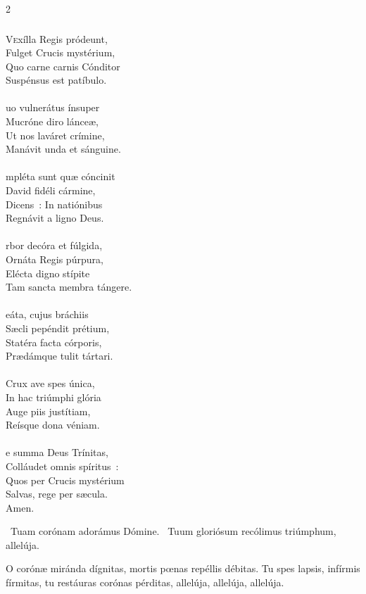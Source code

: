\documentclass[9pt,twoside]{extarticle}
\begin{document}
\begin{multicols}{2}
{{\subsubsection*{\center {}}
\lettrine{V}exílla Regis pródeunt,\\
Fulget Crucis mystérium,\\
Quo carne carnis Cónditor\\
Suspénsus est patíbulo.\\
\\
uo vulnerátus ínsuper\\
Mucróne diro lánceæ,\\
Ut nos laváret crímine,\\
Manávit unda et sánguine.\\
\\
mpléta sunt quæ cóncinit\\
David fidéli cármine,\\
Dicens~: In natiónibus\\
Regnávit a ligno Deus.\\
\\
rbor decóra et fúlgida,\\
Ornáta Regis púrpura,\\
Elécta digno stípite\\
Tam sancta membra tángere.\\
\\
eáta, cujus bráchiis\\
Sæcli pepéndit prétium,\\
Statéra facta córporis,\\
Prædámque tulit tártari.\\
\\
 Crux ave spes única,\\
In hac triúmphi glória\\
Auge piis justítiam,\\
Reísque dona véniam.\\
\\
e summa Deus Trínitas,\\
Colláudet omnis spíritus~:\\
Quos per Crucis mystérium\\
Salvas, rege per sæcula.\\
Amen.

\begin{tightlist}{}
\item {}~Tuam corónam adorámus Dómine. ~Tuum gloriósum recólimus triúmphum, allelúja.
\item {} O corónæ miránda dígnitas, mortis pœnas repéllis débitas. Tu spes lapsis, infírmis fírmitas, tu restáuras corónas pérditas, allelúja, allelúja, allelúja.
\end{tightlist}

}}
\end{multicols}
\end{document}
